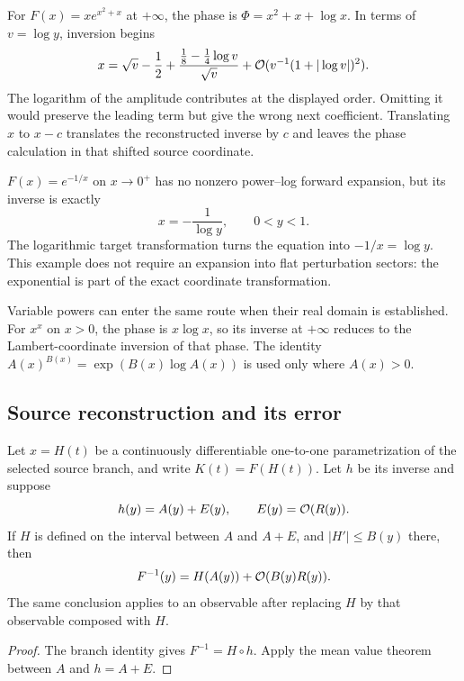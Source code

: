 \begin{example}
For $F(x)=xe^{x^2+x}$ at $+\infty$, the phase is $\Phi=x^2+x+\log x$. In terms of $v=\log y$, inversion begins
\[
 x=\sqrt v-\frac12+
 \frac{\tfrac18-\tfrac14\log v}{\sqrt v}
 +\mathcal O(v^{-1}(1+|\log v|)^2).
\]
The logarithm of the amplitude contributes at the displayed order. Omitting it would preserve the leading term but give the wrong next coefficient. Translating $x$ to $x-c$ translates the reconstructed inverse by $c$ and leaves the phase calculation in that shifted source coordinate.
\end{example}

\begin{example}
$F(x)=e^{-1/x}$ on $x\to0^+$ has no nonzero power--log forward expansion, but its inverse is exactly
\[
 x=-\frac1{\log y},\qquad 0<y<1.
\]
The logarithmic target transformation turns the equation into $-1/x=\log y$. This example does not require an expansion into flat perturbation sectors: the exponential is part of the exact coordinate transformation.
\end{example}

Variable powers can enter the same route when their real domain is established. For $x^x$ on $x>0$, the phase is $x\log x$, so its inverse at $+\infty$ reduces to the Lambert-coordinate inversion of that phase. The identity $A(x)^{B(x)}=\exp(B(x)\log A(x))$ is used only where $A(x)>0$.

\subsection{Source reconstruction and its error}

\begin{theorem}
\label{thm:source-coordinate}
Let $x=H(t)$ be a continuously differentiable one-to-one parametrization of the selected source branch, and write $K(t)=F(H(t))$. Let $h$ be its inverse and suppose
\[
 h(y)=A(y)+E(y),\qquad E(y)=\mathcal O(R(y)).
\]
If $H$ is defined on the interval between $A$ and $A+E$, and $|H'|\le B(y)$ there, then
\[
 F^{-1}(y)=H(A(y))+\mathcal O(B(y)R(y)).
\]
The same conclusion applies to an observable after replacing $H$ by that observable composed with $H$.
\end{theorem}
\begin{proof}
The branch identity gives $F^{-1}=H\circ h$. Apply the mean value theorem between $A$ and $h=A+E$.
\end{proof}


